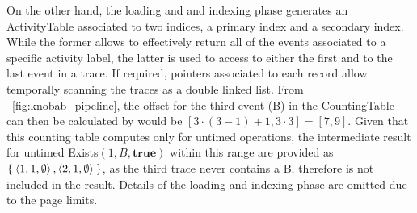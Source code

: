 
On the other hand, the loading and and indexing phase generates an \textsf{ActivityTable} associated to two indices, a primary index and a secondary index. While the former allows to effectively return all of the events associated to a specific activity label, the latter is used to access to either the first and to the last event in a trace. If required, pointers associated to each record allow temporally scanning the traces as a double linked list. From \figurename~\ref{fig:knobab_pipeline}, the offset for the third event (B) in the \textsf{CountingTable} can then be calculated by would be $[3 \cdot (3-1) + 1, 3 \cdot 3] = [7,9]$. Given that this counting table computes only for untimed operations, the intermediate result for untimed \textsf{Exists}$(1,B,\textbf{true})$ within this range are provided as $\Set{\braket{1,1,\emptyset}, \braket{2,1,\emptyset}}$, as the third trace never contains a B, therefore is not included in the result.
Details of the loading and indexing phase are omitted due to the page limits.



